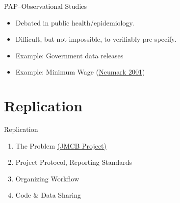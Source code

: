 \documentclass{beamer}
\begin{document}
{ %
    \begin{frame}[plain]
     \end{frame}
}
\begin{frame}{PAP--Observational Studies}
\begin{itemize}[<.->]
\item Debated in public health/epidemiology.
\item Difficult, but not impossible, to verifiably pre-specify.
\item Example: Government data releases
\item Example: Minimum Wage (\href{http://onlinelibrary.wiley.com/doi/10.1111/0019-8676.00199/full}{Neumark 2001})
\end{itemize}
\end{frame}

{ %
    \begin{frame}[plain]
     \end{frame}
}
\section{Replication}
\begin{frame}{Replication}
\begin{enumerate}[<.->]
 \item The Problem	\href{http://www.jstor.org/stable/1806061}{(JMCB Project)}
 \item Project Protocol, Reporting Standards
 \item Organizing Workflow
 \item Code \& Data Sharing
\end{enumerate}
\end{frame}
\end{document}
